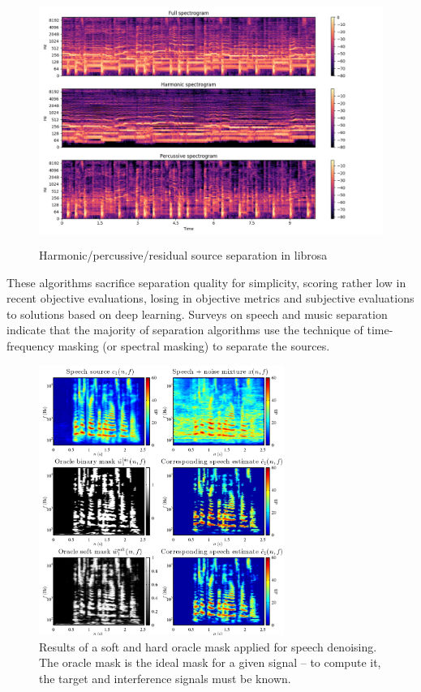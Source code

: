 \documentclass[report.tex]{subfiles}
\begin{document}
\begin{figure}[ht]
	\centering
	\includegraphics[height=8cm]{./images-mss/sphx_glr_plot_hprss_001.png}
	\caption{Harmonic/percussive/residual source separation in librosa}
	\label{fig:hpsslibrosa}
\end{figure}


These algorithms sacrifice separation quality for simplicity, scoring rather low in recent objective evaluations\cite{sisec2018}, losing in objective metrics and subjective evaluations to solutions based on deep learning\cite{umx, demucs}.
Surveys on speech \cite{speechmask} and music separation \cite{musicmask} indicate that the majority of separation algorithms use the technique of time-frequency masking (or spectral masking) to separate the sources.

\begin{figure}[ht]
	\vspace{-1.0em}
	\includegraphics[width=8cm]{./images-mss/maskdemo.png}
	\caption{Results of a soft and hard oracle mask applied for speech denoising. The oracle mask is the ideal mask for a given signal -- to compute it, the target and interference signals must be known.}
	\label{fig:masks}
	\vspace{-1.5em}
\end{figure}
\end{document}
